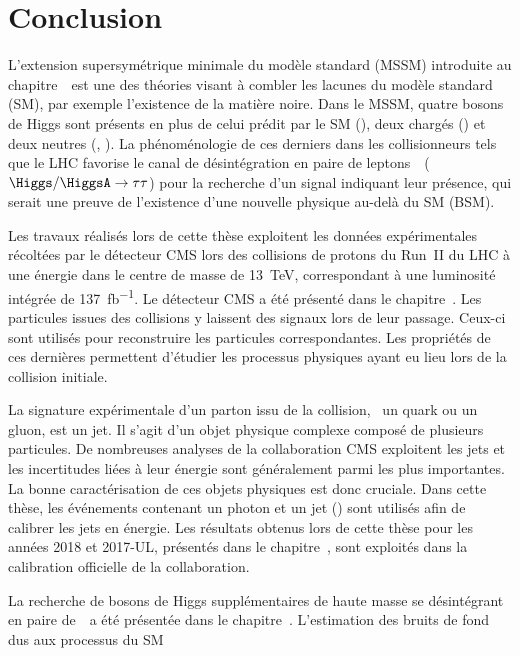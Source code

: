 \chapter*{Conclusion}\label{chapter-conclusion}

L'extension supersymétrique minimale du modèle standard (MSSM)
introduite au chapitre~\
est une des théories visant à combler les lacunes du modèle standard (SM),
par exemple l'existence de la matière noire.
Dans le MSSM,
quatre bosons de Higgs sont présents en plus de celui prédit par le SM (\higgs),
deux chargés (\Higgspm)
et
deux neutres (\Higgs, \HiggsA).
La phénoménologie de ces derniers dans les collisionneurs tels que le LHC
favorise le canal de désintégration en paire de leptons~\tau\
($\Higgs/\HiggsA\to\tau\tau$)
pour la recherche d'un signal indiquant leur présence,
qui serait une preuve de l'existence d'une nouvelle physique
au-delà du SM (BSM).
\par
Les travaux réalisés lors de cette thèse
exploitent les données expérimentales
récoltées par le détecteur CMS
lors des collisions de protons du Run~II du LHC
à une énergie dans le centre de masse de \SI{13}{\TeV},
correspondant à une luminosité intégrée de \SI{137}{\femto\barn^{-1}}.
Le détecteur CMS a été présenté dans le chapitre~.
Les particules issues des collisions y laissent des signaux lors de leur passage.
Ceux-ci sont utilisés pour reconstruire les particules correspondantes.
Les propriétés de ces dernières permettent d'étudier les processus physiques
ayant eu lieu lors de la collision initiale.
\par
La signature expérimentale
d'un parton issu de la collision, \ie\ un quark ou un gluon,
est un jet.
Il s'agit d'un objet physique complexe
composé de plusieurs particules.
De nombreuses analyses de la collaboration CMS exploitent les jets
et
les incertitudes liées à leur énergie sont généralement parmi les plus importantes.
La bonne caractérisation de ces objets physiques est donc cruciale.
Dans cette thèse,
les événements contenant un photon et un jet (\Gjet)
sont utilisés afin de calibrer les jets en énergie.
Les résultats obtenus lors de cette thèse pour les années 2018 et 2017-UL,
présentés dans le chapitre~\refChJERC,
sont exploités dans la calibration officielle de la collaboration.
\par
La recherche de bosons de Higgs supplémentaires de haute masse se désintégrant en paire de~\tau\
a été présentée dans le chapitre~.
L'estimation des bruits de fond dus aux processus du SM
